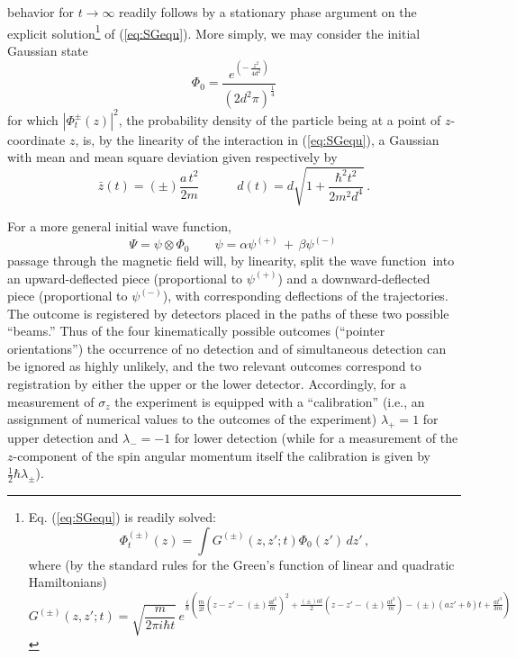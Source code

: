 \documentclass[12pt]{article}
\newcommand{\wf}{wave function}
\begin{document}
behavior for $t\to\infty$ readily follows by a stationary phase
argument on the explicit solution\footnote{Eq. (\ref{eq:SGequ}) is
   readily solved:
   $$
   \Phi^{(\pm)}_{t}(z) = \int G^{(\pm)}(z,z';t) \Phi_{0}(z')\,
   dz'\,,
\label{eq:solpauli}
$$
where (by the standard rules for the Green's function of linear and
quadratic Hamiltonians)
$$
G^{(\pm)}(z,z';t) = \sqrt{\frac{m}{ 2 \pi i \hbar t}}\,
e^{\frac{i}{\hbar} \left( \frac{m}{2t}\left( z-z' -
       (\pm)\frac{at^{2}}{m}\right)^{2} + \frac{(\pm) at}{2} \left(
       z-z' - (\pm)\frac{at^{2}}{m}\right) -(\pm) (az'+b) t +
     \frac{at^{3}}{3m} \right)}
\label{eq:proppauli}
$$} of (\ref{eq:SGequ}). More simply, we may consider the initial
Gaussian state $$\Phi_{0}= \frac {e^{( - \,\frac {z^{2}}{4d^{2}}) }}{
   (2 d^{2}\pi)^\frac{1}{4} } $$
for which $|\Phi_{t}^{\pm}(z)|^2$, the
probability density of the particle being at a point of $z$-coordinate
$z$, is, by the linearity of the interaction in (\ref{eq:SGequ}), a
Gaussian with mean and mean square deviation given respectively by
\begin{equation}
\bar{z}(t) =(\pm) \frac {a\,t^{2}}{2 m}\quad\qquad d(t) =d \sqrt{1+
\frac{\hbar^{2} t^{2} }{2 m^{2}d^{4}} }\,.
\label{eq:mmsd}
\end{equation}

For a more general initial \wf,
\begin{equation}
\label{sgpsi}
\Psi = \psi  \otimes \Phi_0\qquad \psi=
\alpha
\psi^{(+)}\,+\,
\beta\psi^{(-)}\,
\end{equation}
passage through the magnetic field will, by linearity, split the \wf\
into an upward-deflected piece (proportional to $\psi^{(+)}$) and a
downward-deflected piece (proportional to $\psi^{(-)}$), with
corresponding deflections of the trajectories.  The outcome is
registered by detectors placed in the paths of these two possible
``beams.''  Thus of the four kinematically possible outcomes
(``pointer orientations'') the occurrence of no detection and of
simultaneous detection can be ignored as highly unlikely, and the two
relevant outcomes correspond to registration by either the upper or
the lower detector.  Accordingly, for a measurement of $\sigma_z$ the
experiment is equipped with a ``calibration'' (i.e., an assignment of
numerical values to the outcomes of the experiment) $\lambda_{+}=1$
for upper detection and $\lambda_{-}=-1$ for lower detection (while
for a measurement of the $z$-component of the spin angular momentum
itself the calibration is given by $\frac 12\hbar\lambda_{\pm}$).
\end{document}
